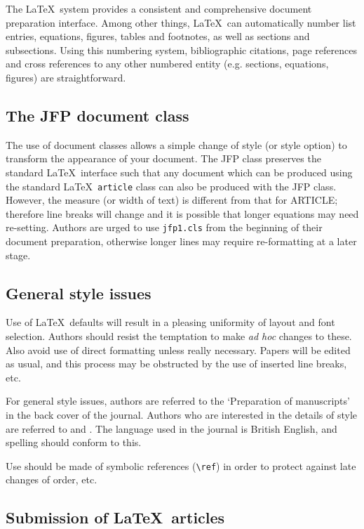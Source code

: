 \documentclass{jfp1}
\begin{document}
The \LaTeX\ system provides a consistent and comprehensive document preparation
interface. Among other things, \LaTeX\ can automatically number list
entries, equations, figures, tables and footnotes, as well as sections and
subsections. Using this numbering system, bibliographic citations, page
references and cross references to any other numbered entity (e.g. sections,
equations, figures) are straightforward.

\subsection{The JFP document class}

The use of document classes allows a simple change of style (or style option)
to transform the appearance of your document. The JFP class preserves the
standard \LaTeX\ interface such that any document which can be produced
using the standard \LaTeX\ \verb"article" class can also be produced with
the JFP class.
However, the measure (or width of text) is different from that
for ARTICLE; therefore line breaks will change and it is possible that
longer equations may need re-setting.
Authors are urged to use \verb"jfp1.cls" from the beginning of their document
preparation, otherwise longer lines may require re-formatting at a later stage.

\subsection{General style issues}

Use of \LaTeX\ defaults will result in a pleasing uniformity of layout
and font selection. Authors should resist the temptation to make
\emph{ad hoc} changes to these. Also avoid use of direct formatting unless
really necessary. Papers will be edited as usual, and this process may be
obstructed by the use of inserted line breaks, etc.

For general style issues, authors are referred to the `Preparation of
manuscripts' in the back cover of the journal. Authors who are interested in
the details of style are referred to \cite{Butcher} and \cite{Chicago}. The
language used in the journal is British English, and spelling should conform
to this.

Use should be made of symbolic references (\verb"\ref") in order to
protect against late changes of order, etc.

\subsection{Submission of \LaTeX\ articles}
\end{document}
